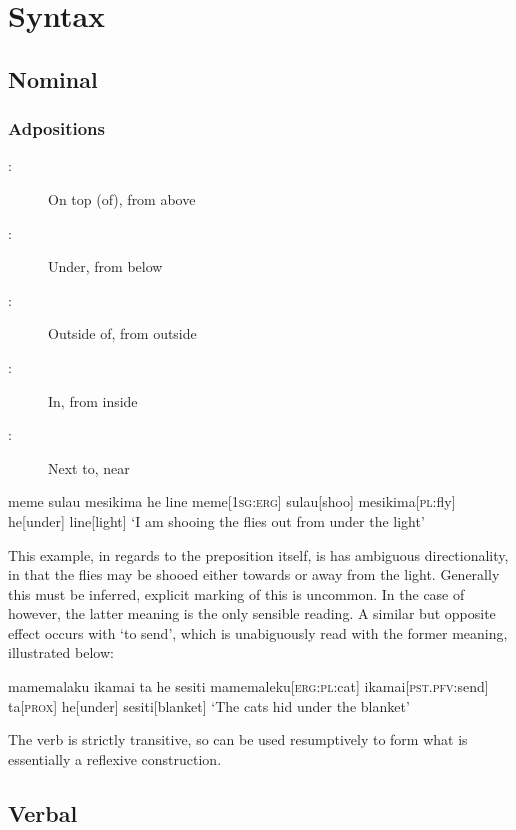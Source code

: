 \part{Syntax}

\chapter{Nominal}

\section{Adpositions}

\begin{description}
  \item[:] On top (of), from above
  \item[:] Under, from below
  \item[:] Outside of, from outside
  \item[:] In, from inside
  \item[:] Next to, near
\end{description}

\ex
\begingl
\glpreamble meme sulau mesikima he line
\endpreamble
meme[\textsc{1sg:erg}]
sulau[shoo]
mesikima[\textsc{pl:}fly]
he[under]
line[light]
\glft `I am shooing the flies out from under the light'
\endgl
\xe

This example, in regards to the preposition itself, is has ambiguous directionality, in that the flies may be shooed either towards or away from the light. Generally this must be inferred, explicit marking of this is uncommon. In the case of  however, the latter meaning is the only sensible reading. A similar but opposite effect occurs with  `to send', which is unabiguously read with the former meaning, illustrated below:

\ex
\begingl
\glpreamble mamemalaku ikamai ta he sesiti
\endpreamble
mamemaleku[\textsc{erg:pl:}cat]
ikamai[\textsc{pst.pfv:}send]
ta[\textsc{prox}]
he[under]
sesiti[blanket]
\glft `The cats hid under the blanket'
\endgl
\xe

The verb  is strictly transitive, so  can be used resumptively to form what is essentially a reflexive construction.
\chapter{Verbal}

